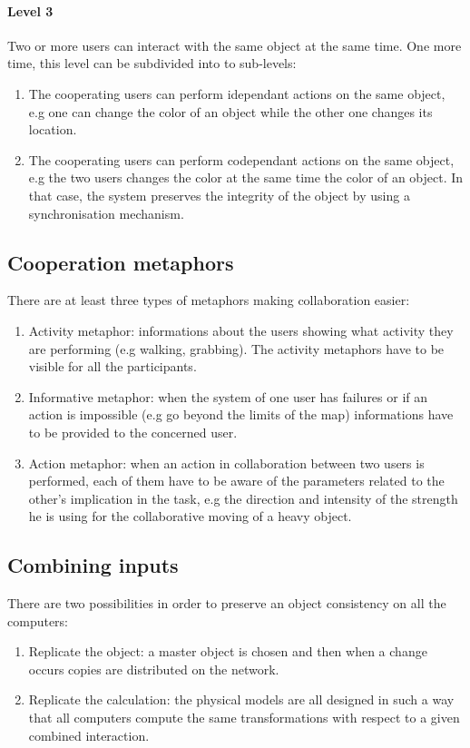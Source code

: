 \documentclass[a4paper]{article}
\begin{document}
\paragraph{Level 3} Two or more users can interact with the same object at the same time. One more time, this level can be subdivided into to sub-levels:
\begin{enumerate}
	\item The cooperating users can perform idependant actions on the same object, e.g one can change the color of an object while the other one changes its location.
	\item The cooperating users can perform codependant actions on the same object, e.g the two users changes the color at the same time the color of an object. In that case, the system preserves the integrity of the object by using a synchronisation mechanism.
\end{enumerate}

\subsection{Cooperation metaphors}
There are at least three types of metaphors making collaboration easier:
\begin{enumerate}
	\item Activity metaphor: informations about the users showing what activity they are performing (e.g walking, grabbing). The activity metaphors have to be visible for all the participants.
	\item Informative metaphor: when the system of one user has failures or if an action is impossible (e.g go beyond the limits of the map) informations have to be provided to the concerned user.
	\item Action metaphor: when an action in collaboration between two users is performed, each of them have to be aware of the parameters related to the other's implication in the task, e.g the direction and intensity of the strength he is using for the collaborative moving of a heavy object.
\end{enumerate}

\subsection{Combining inputs}
There are two possibilities in order to preserve an object consistency on all the computers:
\begin{enumerate}
	\item Replicate the object: a master object is chosen and then when a change occurs copies are distributed on the network.
	\item Replicate the calculation: the physical models are all designed in such a way that all computers compute the same transformations with respect to a given combined interaction.
\end{enumerate}
\end{document}
